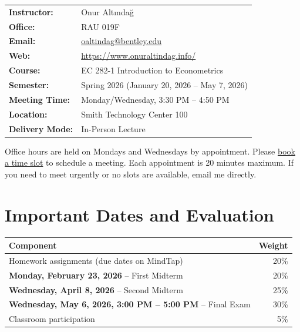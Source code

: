 \documentclass[11pt,letterpaper]{article}
\begin{document}
\begin{tabularx}{\textwidth}{@{}lX@{}}
\textbf{Instructor:} & Onur Altındağ \\
\textbf{Office:} & RAU 019F \\
\textbf{Email:} & \href{mailto:oaltindag@bentley.edu}{oaltindag@bentley.edu} \\
\textbf{Web:} & \url{https://www.onuraltindag.info/} \\[0.3cm]
\textbf{Course:} & EC 282-1 Introduction to Econometrics \\
\textbf{Semester:} & Spring 2026 (January 20, 2026 – May 7, 2026) \\
\textbf{Meeting Time:} & Monday/Wednesday, 3:30 PM – 4:50 PM \\
\textbf{Location:} & Smith Technology Center 100 \\
\textbf{Delivery Mode:} & In-Person Lecture \\
\end{tabularx}

\vspace{0.3cm}

Office hours are held on Mondays and Wednesdays by appointment. Please \href{https://outlook.office.com/bookwithme/user/1c4e4f54e0f0493397e615b2c80a59c7\%40bentley.edu/meetingtype/PxtkOiMCu0m4QV32Y3tEaw2?bookingcode=097c05f0-ef41-47c9-9d76-fcf8bab2bc80&anonymous&ismsaljsauthenabled}{book a time slot} to schedule a meeting. Each appointment is 20 minutes maximum. If you need to meet urgently or no slots are available, email me directly.

\section*{Important Dates and Evaluation}

\begin{tabularx}{\textwidth}{@{}Xr@{}}
\toprule
\textbf{Component} & \textbf{Weight} \\
\midrule
Homework assignments (due dates on MindTap) & 20\% \\
\textbf{Monday, February 23, 2026} – First Midterm & 20\% \\
\textbf{Wednesday, April 8, 2026} – Second Midterm & 25\% \\
\textbf{Wednesday, May 6, 2026, 3:00 PM – 5:00 PM} – Final Exam & 30\% \\
Classroom participation & 5\% \\
\bottomrule
\end{tabularx}
\end{document}
